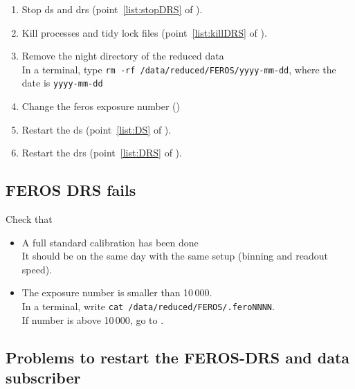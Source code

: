 \documentclass[11pt,fleqn,a4paper]{book}
\begin{document}
\label{proc:FEROSfix10000}
\begin{enumerate}
    \item Stop \gls{ds} and \gls{drs} (point~\ref{list:stopDRS} of ).
    \item Kill processes and tidy lock files (point~\ref{list:killDRS} of ).
    \item Remove the night directory of the reduced data\\
          In a terminal, type \texttt{rm -rf /data/reduced/FEROS/yyyy-mm-dd},
          where the date is \texttt{yyyy-mm-dd}
    \item Change the \gls{feros} exposure number ()
    \item Restart the \gls{ds} (point~\ref{list:DS} of ).
    \item Restart the \gls{drs} (point~\ref{list:DRS} of ).
\end{enumerate}


\subsection{FEROS DRS fails}

Check that
\begin{itemize}
    \item A full standard calibration has been done\\
          It should be on the same day with the same setup (binning and readout speed).
    \item The exposure number is smaller than 10\,000.\\
          In a terminal, write \texttt{cat /data/reduced/FEROS/.feroNNNN}.\\
          If number is above 10\,000, go to .
\end{itemize}

\subsection{Problems to restart the FEROS-DRS and data subscriber}
\end{document}
